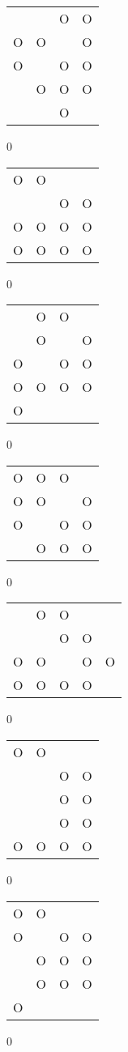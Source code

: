 \begin{tabular}{|m{0.2cm}m{0.2cm}m{0.2cm}m{0.2cm}|}\hline
 & &O&O\\
O&O& &O\\
O& &O&O\\
 &O&O&O\\
 & &O& \\
\hline\end{tabular}0
\begin{tabular}{|m{0.2cm}m{0.2cm}m{0.2cm}m{0.2cm}|}\hline
O&O& & \\
 & &O&O\\
O&O&O&O\\
O&O&O&O\\
\hline\end{tabular}0
\begin{tabular}{|m{0.2cm}m{0.2cm}m{0.2cm}m{0.2cm}|}\hline
 &O&O& \\
 &O& &O\\
O& &O&O\\
O&O&O&O\\
O& & & \\
\hline\end{tabular}0
\begin{tabular}{|m{0.2cm}m{0.2cm}m{0.2cm}m{0.2cm}|}\hline
O&O&O& \\
O&O& &O\\
O& &O&O\\
 &O&O&O\\
\hline\end{tabular}0
\begin{tabular}{|m{0.2cm}m{0.2cm}m{0.2cm}m{0.2cm}m{0.2cm}|}\hline
 &O&O& & \\
 & &O&O& \\
O&O& &O&O\\
O&O&O&O& \\
\hline\end{tabular}0
\begin{tabular}{|m{0.2cm}m{0.2cm}m{0.2cm}m{0.2cm}|}\hline
O&O& & \\
 & &O&O\\
 & &O&O\\
 & &O&O\\
O&O&O&O\\
\hline\end{tabular}0
\begin{tabular}{|m{0.2cm}m{0.2cm}m{0.2cm}m{0.2cm}|}\hline
O&O& & \\
O& &O&O\\
 &O&O&O\\
 &O&O&O\\
O& & & \\
\hline\end{tabular}0
